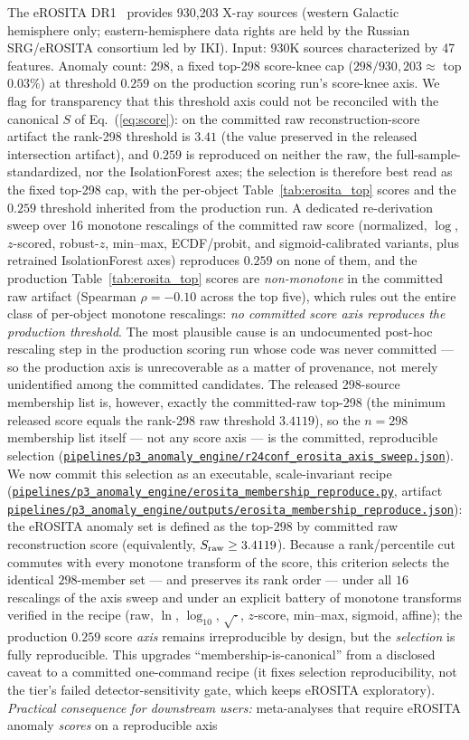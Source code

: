 \documentclass[aps,prd,twocolumn,superscriptaddress,showpacs,preprintnumbers,nofootinbib,longbibliography,floatfix]{revtex4-2}
\newcommand{\repoBase}{https://github.com/Hubify-Projects/bigbounce/blob/main}
\newcommand{\artifact}[1]{\href{\repoBase/#1}{\nolinkurl{#1}}}
\begin{document}
The eROSITA DR1~\cite{eROSITA_DR1} provides 930{,}203 X-ray sources (western Galactic hemisphere only; eastern-hemisphere data rights are held by the Russian SRG/eROSITA consortium led by IKI). Input: 930K sources characterized by 47 features. Anomaly count: 298, a fixed top-298 score-knee cap ($298/930{,}203 \approx$ top $0.03\%$) at threshold $0.259$ on the production scoring run's score-knee axis. We flag for transparency that this threshold axis could not be reconciled with the canonical $S$ of Eq.~(\ref{eq:score}): on the committed raw reconstruction-score artifact the rank-298 threshold is $3.41$ (the value preserved in the released intersection artifact), and $0.259$ is reproduced on neither the raw, the full-sample-standardized, nor the IsolationForest axes; the selection is therefore best read as the fixed top-298 cap, with the per-object Table~\ref{tab:erosita_top} scores and the $0.259$ threshold inherited from the production run. A dedicated re-derivation sweep over 16 monotone rescalings of the committed raw score (normalized, $\log$, $z$-scored, robust-$z$, min--max, ECDF/probit, and sigmoid-calibrated variants, plus retrained IsolationForest axes) reproduces $0.259$ on none of them, and the production Table~\ref{tab:erosita_top} scores are \emph{non-monotone} in the committed raw artifact (Spearman $\rho = -0.10$ across the top five), which rules out the entire class of per-object monotone rescalings: \emph{no committed score axis reproduces the production threshold}. The most plausible cause is an undocumented post-hoc rescaling step in the production scoring run whose code was never committed --- so the production axis is unrecoverable as a matter of provenance, not merely unidentified among the committed candidates. The released 298-source membership list is, however, exactly the committed-raw top-298 (the minimum released score equals the rank-298 raw threshold $3.4119$), so the $n = 298$ membership list itself --- not any score axis --- is the committed, reproducible selection (\artifact{pipelines/p3\_anomaly\_engine/r24conf\_erosita\_axis\_sweep.json}). We now commit this selection as an executable, scale-invariant recipe (\artifact{pipelines/p3\_anomaly\_engine/erosita\_membership\_reproduce.py}, artifact \artifact{pipelines/p3\_anomaly\_engine/outputs/erosita\_membership\_reproduce.json}): the eROSITA anomaly set is defined as the top-$298$ by committed raw reconstruction score (equivalently, $S_{\rm raw} \ge 3.4119$). Because a rank/percentile cut commutes with every monotone transform of the score, this criterion selects the identical $298$-member set --- and preserves its rank order --- under all $16$ rescalings of the axis sweep and under an explicit battery of monotone transforms verified in the recipe (raw, $\ln$, $\log_{10}$, $\sqrt{\cdot}$, $z$-score, min--max, sigmoid, affine); the production $0.259$ score \emph{axis} remains irreproducible by design, but the \emph{selection} is fully reproducible. This upgrades ``membership-is-canonical'' from a disclosed caveat to a committed one-command recipe (it fixes selection reproducibility, not the tier's failed detector-sensitivity gate, which keeps eROSITA exploratory). \emph{Practical consequence for downstream users:} meta-analyses that require eROSITA anomaly \emph{scores} on a reproducible axis 
\end{document}
